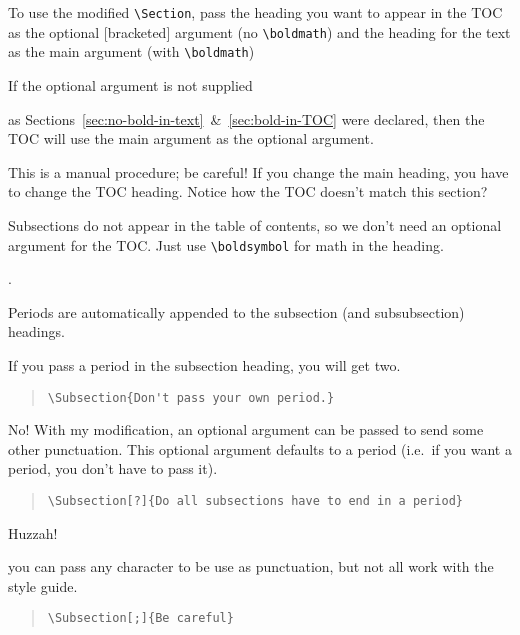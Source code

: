 \documentclass{iitthesis}
\begin{document}
To use the modified \verb|\Section|, pass the heading you want 
to appear in the TOC as the optional [bracketed] argument (no \verb|\boldmath|) 
and the heading for the text as the main argument (with \verb|\boldmath|)
\begin{quotation}
	\begin{verb}
	\end{verb}
\end{quotation}
If the optional argument is not supplied
\begin{quotation}
	\begin{verb}
		\Section{A section about bolded $\boldsymbol{\sqrt{x^2+y^2}}$}
	\end{verb}
\end{quotation}
as Sections~\ref{sec:no-bold-in-text}~\&~\ref{sec:bold-in-TOC} were declared, 
then the TOC will use the main argument as the optional argument.


This is a manual procedure; be careful! If you change the main heading, 
you have to change the TOC heading. Notice how the TOC doesn't match this section?

%
Subsections do not appear in the table of contents,
so we don't need an optional argument for the TOC. 
Just use \verb|\boldsymbol| for math in the heading.


.

% 
Periods are automatically appended to the subsection (and subsubsection) headings. 

% 
If you pass a period in the subsection heading, you will get two.
%
\begin{quotation}
	\verb|\Subsection{Don't pass your own period.}|
\end{quotation}

%
No! With my modification, an optional argument can be passed to send
some other punctuation. This optional argument defaults to a period
(i.e.\ if you want a period, you don't have to pass it).
%
\begin{quotation}
	\verb|\Subsection[?]{Do all subsections have to end in a period}|
\end{quotation}

 Huzzah!

% 
you can pass any character to be use as punctuation, but not all work with the style guide.
% 
\begin{quotation}
	\verb|\Subsection[;]{Be careful}|
\end{quotation}
\end{document}

